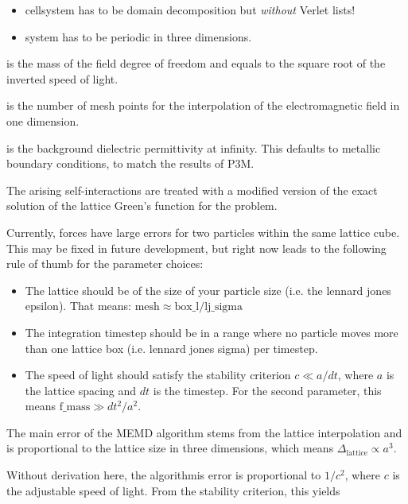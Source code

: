 \begin{itemize}
  \item cellsystem has to be domain decomposition but \emph{without}
    Verlet lists!
  \item system has to be periodic in three dimensions.
\end{itemize}

\begin{arguments}
\item[\var{f\_mass}] is the mass of the field degree of freedom and equals
  to the square root of the inverted speed of light.
\item[\var{mesh}] is the number of mesh points for the interpolation
  of the electromagnetic field in one dimension.
\item[\var{\varepsilon_{\infty}}] is the background dielectric
  permittivity at infinity. This defaults to metallic boundary
  conditions, to match the results of P3M.
\end{arguments}

The arising self-interactions are treated with a modified version of
the exact solution of the lattice Green's function for the
problem.

Currently, forces have large errors for two particles within the same
lattice cube. This may be fixed in future development, but right now
leads to the following rule of thumb for the parameter choices:

\begin{itemize}
  \item The lattice should be of the size of your particle size
    (i.e. the lennard jones epsilon). That means: $\text{mesh} \approx
    \text{box\_l} / \text{lj\_sigma}$
  \item The integration timestep should be in a range where no
    particle moves more than one lattice box (i.e. lennard jones
    sigma) per timestep.
  \item The speed of light should satisfy the stability criterion
    $c\ll a/dt$, where $a$ is the lattice spacing and $dt$ is the
    timestep. For the second parameter, this means $\text{f\_mass} \gg
    dt^2/a^2$.
\end{itemize}

The main error of the MEMD algorithm stems from the lattice
interpolation and is proportional to the lattice size in three
dimensions, which means $\Delta_\text{lattice} \propto a^3$.

Without derivation here, the algorithmis error is proportional to
$1/c^2$, where $c$ is the adjustable speed of light. From the
stability criterion, this yields

